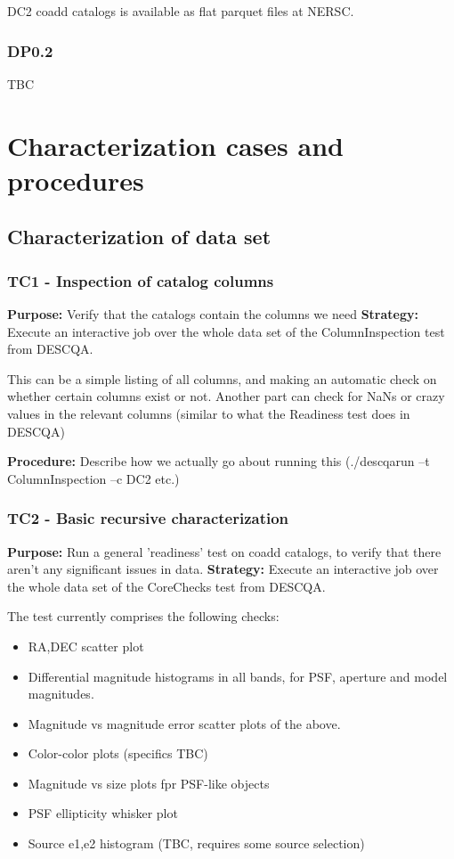 \documentclass[12pt, a4paper]{article}
\begin{document}
DC2 coadd catalogs is available as flat parquet files at NERSC.

\subsubsection{DP0.2}

TBC


\section{Characterization cases and procedures}

\subsection{Characterization of data set}
\subsubsection{TC1 - Inspection of catalog columns}
\textbf{Purpose:} Verify that the catalogs contain the columns we need
\textbf{Strategy:} Execute an interactive job over the whole data set of the ColumnInspection test from DESCQA.

This can be a simple listing of all columns, and making an automatic check on whether certain columns exist or not. 
Another part can check for NaNs or crazy values in the relevant columns (similar to what the Readiness test does in DESCQA)

\textbf{Procedure:} Describe how we actually go about running this (./descqarun --t ColumnInspection --c DC2 etc.)

\subsubsection{TC2 - Basic recursive characterization}
\textbf{Purpose:} Run a general 'readiness' test on coadd catalogs, to verify that there aren't any significant issues in data. 
\textbf{Strategy:} Execute an interactive job over the whole data set of the CoreChecks test from DESCQA.

The test currently comprises the following checks:
\begin{itemize}
	\item RA,DEC scatter plot
	\item Differential magnitude histograms in all bands, for PSF, aperture and model magnitudes.
	\item Magnitude vs magnitude error scatter plots of the above.
	\item Color-color plots (specifics TBC)
	\item Magnitude vs size plots fpr PSF-like objects
	\item PSF ellipticity whisker plot
	\item Source e1,e2 histogram (TBC, requires some source selection)
\end{itemize}
\end{document}
